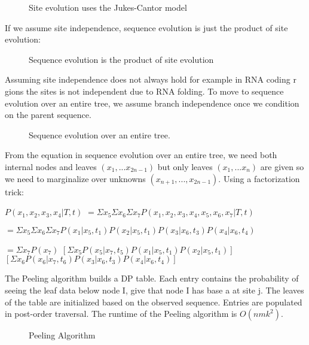 \begin{figure}[ht!]
  \centering
  \caption{Site evolution uses the Jukes-Cantor model}
  \label{Fig03_SiteEvolution}
\end{figure}
\noindent If we assume site independence, sequence evolution is just
the product of site evolution:

\begin{figure}[ht!]
  \centering
  \caption{Sequence evolution is the product of site evolution}
  \label{Fig04_SequenceEvolution}
\end{figure}

\noindent Assuming site independence does not always hold for example
in RNA coding r gions the sites is not independent due to RNA
folding. To move to sequence evolution over an entire tree, we assume
branch independence once we condition on the parent sequence.

\begin{figure}[ht!]
  \centering
  \caption{Sequence evolution over an entire tree.}
  \label{Fig05_SequenceEvolutionOverTree}
\end{figure}

\noindent From the equation in sequence evolution over an entire tree,
we need both internal nodes and leaves $(x_1,...x_{2n-1})$ but only
leaves $(x_1,...x_n)$ are given so we need to marginalize over
unknowns $(x_{n+1},...,x_{2n-1})$. Using a factorization trick:

$P(x_1,x_2,x_3,x_4|T,t)$ 
$= \Sigma x_5 \Sigma x_6 \Sigma x_7 P(x_1,x_2,x_3,x_4,x_5,x_6,x_7|T,t)$

$= \Sigma x_5 \Sigma x_6 \Sigma x_7 P(x_1|x_5,t_1)P(x_2|x_5,t_1)P(x_3|x_6,t_3)P(x_4|x_6,t_4)$ 

$= \Sigma x_7 P(x_7)$
$[\Sigma x_5 P(x_5|x_7,t_5)P(x_1|x_5,t_1)P(x_2|x_5,t_1)]$
$[\Sigma x_6 P(x_6|x_7,t_6)P(x_3|x_6,t_3)P(x_4|x_6,t_4)]$

\noindent The Peeling algorithm builds a DP table. Each entry contains
the probability of seeing the leaf data below node I, give that node I
has base a at site j. The leaves of the table are initialized based on
the observed sequence. Entries are populated in post-order
traversal. The runtime of the Peeling algorithm is $O(nmk^2)$.

\begin{figure}[ht!]
  \centering
  \caption{Peeling Algorithm}
  \label{Fig06_PeelingAlgorithm}
\end{figure}


